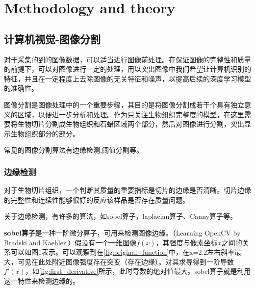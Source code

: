 \section{Methodology and theory}
\label{sec:problem_description}

\subsection{计算机视觉-图像分割}

对于采集的到的图像数据，可以适当进行图像前处理。在保证图像的完整性和质量的前提下，可以对图像进行一定的处理，用以突出图像中我们希望让计算机识别的特征，并且在一定程度上去除图像的无关特征和噪声，以提高后续的深度学习模型的准确性。

图像分割是图像处理中的一个重要步骤，其目的是将图像分割成若干个具有独立意义的区域，以便进一步分析和处理。作为只关注生物组织完整度的模型，在这里需要将生物切片分割成生物组织和石蜡区域两个部分，然后对图像进行分割，突出显示生物组织部分的部分。

常见的图像分割算法有边缘检测,阈值分割等。

\subsubsection{边缘检测}
对于生物切片组织，一个判断其质量的重要指标是切片的边缘是否清晰。切片边缘的完整性和连续性能够很好的反应该样品是否存在质量问题。

关于边缘检测，有许多的算法，如sobel算子，laplacian算子、Canny算子等。\cite{3.1}

\textbf{sobel算子}是一种一阶微分算子，可用来检测图像边缘。（Learning OpenCV by Bradski and Kaehler.）假设有一个一维图像$f(x)$，其强度与像素坐标$x$之间的关系可以如图1表示。可以观察到在\autoref{fig:original_function}中，在x=2.2左右斜率最大，可见在此处附近图像强度存在突变（存在边缘）。对其求导得到一阶导数$f'(x)$，如\autoref{fig:first_derivative}所示，此时导数的绝对值最大。sobel算子就是利用这一特性来检测边缘的。

